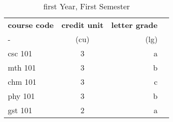 \documentclass{article}
\begin{document}
	\begin{table}[h!]
		\begin{center}
			\caption{first Year, First Semester}
			\label{tab:table1}
			\begin{tabular}{l|c|r|c}
				\textbf{course code} & \textbf{credit unit} & \textbf{letter grade}\\ - & (cu) & (lg) \\
				\hline
				csc 101 & 3 & a\\
				mth 101 & 3 & b\\
				chm 101 & 3 & c\\
				phy 101 & 3 & b\\
				gst 101 & 2 & a\\
			\end{tabular}
		\end{center}
	\end{table}
\end{document}
